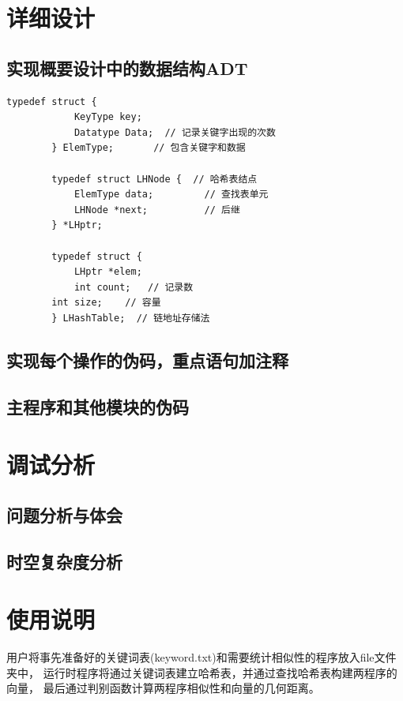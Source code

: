 \documentclass[a4paper]{article}
\begin{document}
    \section{详细设计}\label{sec:design2}

    \subsection{实现概要设计中的数据结构ADT}\label{subsec:adt2}
    \begin{lstlisting}[caption={},label={lst:lstlisting}]
        typedef struct {
            KeyType key;
            Datatype Data;  // 记录关键字出现的次数
        } ElemType;       // 包含关键字和数据

        typedef struct LHNode {  // 哈希表结点
            ElemType data;         // 查找表单元
            LHNode *next;          // 后继
        } *LHptr;

        typedef struct {
            LHptr *elem;
            int count;   // 记录数
        int size;    // 容量
        } LHashTable;  // 链地址存储法
    \end{lstlisting}

    \subsection{实现每个操作的伪码，重点语句加注释}\label{subsec:explain}

    \subsection{主程序和其他模块的伪码}\label{subsec:code2}


    \section{调试分析}\label{sec:debug}

    \subsection{问题分析与体会}\label{subsec:analysis}

    \subsection{时空复杂度分析}\label{subsec:analysis2}


    \section{使用说明}\label{sec:instrut}
    {{用户将事先准备好的关键词表(keyword.txt)和需要统计相似性的程序放入file文件夹中，
    运行时程序将通过关键词表建立哈希表，并通过查找哈希表构建两程序的向量，
    最后通过判别函数计算两程序相似性和向量的几何距离。}}
\end{document}

